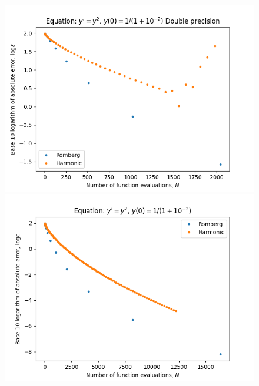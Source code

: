 \begin{figure}[H]
\centering
\begin{minipage}{0.45\textwidth}
\centering
\includegraphics[scale=0.45]{../results/emr_plots/singularity_2.png}
\end{minipage}
\begin{minipage}{0.45\textwidth}
\centering
\includegraphics[scale=0.45]{../results/emr_plots/singularity_2_hp.png}
\end{minipage}
\end{figure}

